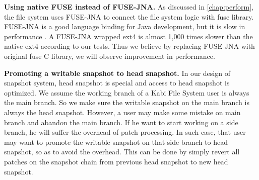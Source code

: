     \textbf{Using native FUSE instead of FUSE-JNA.} As discussed in \cref{chap:perform}, the file system uses FUSE-JNA to connect the file system logic with fuse library. FUSE-JNA is a good language binding for Java development, but it is slow in performance \cite{fusejna}. A FUSE-JNA wrapped ext4 is almost 1,000 times slower than the native ext4 according to our tests. Thus we believe by replacing FUSE-JNA with original fuse C library, we will observe improvement in performance.

    \textbf{Promoting a writable snapshot to head snapshot.} In our design of snapshot system, head snapshot is special and access to head snapshot is optimized. We assume the working branch of a Kabi File System user is always the main branch. So we make sure the writable snapshot on the main branch is always the head snapshot. However, a user may make some mistake on main branch and abandon the main branch. If he want to start working on a side branch, he will suffer the overhead of patch processing. In such case, that user may want to promote the writable snapshot on that side branch to head snapshot, so as to avoid the overhead. This can be done by simply revert all patches on the snapshot chain from previous head snapshot to new head snapshot.
